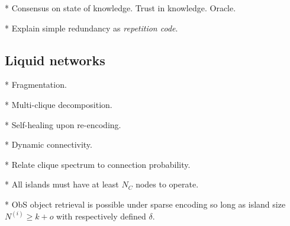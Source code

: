 * Consensus on state of knowledge. Trust in knowledge. Oracle.

* Explain simple redundancy as \emph{repetition code}.

\subsection{Liquid networks}

* Fragmentation.

* Multi-clique decomposition.

* Self-healing upon re-encoding.

* Dynamic connectivity.

* Relate clique spectrum to connection probability.

* All islands must have at least $N_C$ nodes to operate.

* ObS object retrieval is possible under sparse encoding so long as island size $N^{(i)}\geq k+o$ with respectively defined $\delta$.